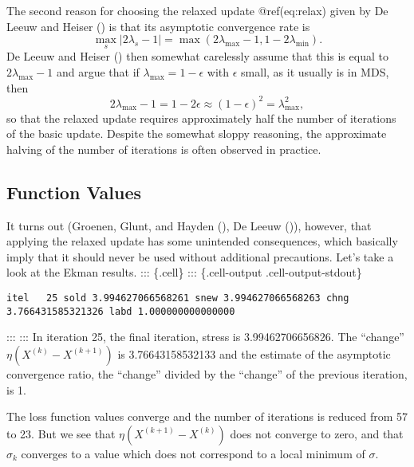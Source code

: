 \documentclass[
  12pt,
  letterpaper,
  DIV=11,
  numbers=noendperiod]{scrartcl}
\begin{document}
The second reason for choosing the relaxed update @ref(eq:relax) given
by De Leeuw and Heiser () is
that its asymptotic convergence rate is \begin{equation}
\max_s|2\lambda_s-1|=\max(2\lambda_{\text{max}}-1,1-2\lambda_{\text{min}}).
\end{equation} De Leeuw and Heiser
() then somewhat carelessly
assume that this is equal to \(2\lambda_{\text{max}}-1\) and argue that
if \(\lambda_{\text{max}}=1-\epsilon\) with \(\epsilon\) small, as it
usually is in MDS, then \begin{equation}
2\lambda_{\text{max}}-1=1-2\epsilon\approx(1-\epsilon)^2=\lambda_{\text{max}}^2,
\end{equation} so that the relaxed update requires approximately half
the number of iterations of the basic update. Despite the somewhat
sloppy reasoning, the approximate halving of the number of iterations is
often observed in practice.

\subsection{Function Values}\label{function-values-4}

It turns out (Groenen, Glunt, and Hayden
(), De Leeuw
()), however, that applying the
relaxed update has some unintended consequences, which basically imply
that it should never be used without additional precautions. Let's take
a look at the Ekman results. ::: \{.cell\} ::: \{.cell-output
.cell-output-stdout\}

\begin{verbatim}
itel   25 sold 3.994627066568261 snew 3.994627066568263 chng 3.766431585321326 labd 1.000000000000000 
\end{verbatim}

::: ::: In iteration 25, the final iteration, stress is
3.99462706656826. The ``change'' \(\eta(X^{(k)}-X^{(k+1)})\) is
3.76643158532133 and the estimate of the asymptotic convergence ratio,
the ``change'' divided by the ``change'' of the previous iteration, is
1.

The loss function values converge and the number of iterations is
reduced from 57 to 23. But we see that \(\eta(X^{(k+1)}-X^{(k)})\) does
not converge to zero, and that \(\sigma_k\) converges to a value which
does not correspond to a local minimum of \(\sigma\).
\end{document}
